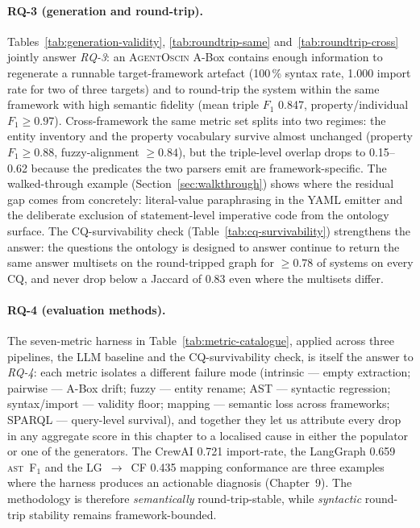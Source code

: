 \paragraph{RQ-3 (generation and round-trip).}
Tables~\ref{tab:generation-validity}, \ref{tab:roundtrip-same}
and~\ref{tab:roundtrip-cross} jointly answer \textit{RQ-3}: an
\textsc{AgentOscin} A-Box contains enough information to regenerate
a runnable target-framework artefact (100\,\% syntax rate, 1.000
import rate for two of three targets) and to round-trip the system
within the same framework with high semantic fidelity (mean triple
$F_1$ 0.847, property/individual $F_1\geq 0.97$). Cross-framework
the same metric set splits into two regimes: the entity inventory
and the property vocabulary survive almost unchanged (property
$F_1\geq 0.88$, fuzzy-alignment $\geq 0.84$), but the triple-level
overlap drops to 0.15--0.62 because the predicates the two parsers
emit are framework-specific. The walked-through example
(Section~\ref{sec:walkthrough}) shows where the residual gap comes
from concretely: literal-value paraphrasing in the YAML emitter and
the deliberate exclusion of statement-level imperative code from the
ontology surface. The CQ-survivability check
(Table~\ref{tab:cq-survivability}) strengthens the answer: the
questions the ontology is designed to answer continue to return the
same answer multisets on the round-tripped graph for $\geq 0.78$ of
systems on every CQ, and never drop below a Jaccard of 0.83 even
where the multisets differ.

\paragraph{RQ-4 (evaluation methods).}
The seven-metric harness in Table~\ref{tab:metric-catalogue}, applied
across three pipelines, the LLM baseline and the CQ-survivability
check, is itself the answer to \textit{RQ-4}: each metric isolates a
different failure mode (intrinsic — empty extraction; pairwise — A-Box
drift; fuzzy — entity rename; AST — syntactic regression; syntax/import
— validity floor; mapping — semantic loss across frameworks;
SPARQL — query-level survival), and together they let us attribute
every drop in any aggregate score in this chapter to a localised cause
in either the populator or one of the generators. The CrewAI 0.721
import-rate, the LangGraph 0.659 \textsc{ast}~F$_1$ and the LG~$\to$~CF
0.435 mapping conformance are three examples where the harness
produces an actionable diagnosis (Chapter~9). The methodology is
therefore \emph{semantically} round-trip-stable, while
\emph{syntactic} round-trip stability remains framework-bounded.

